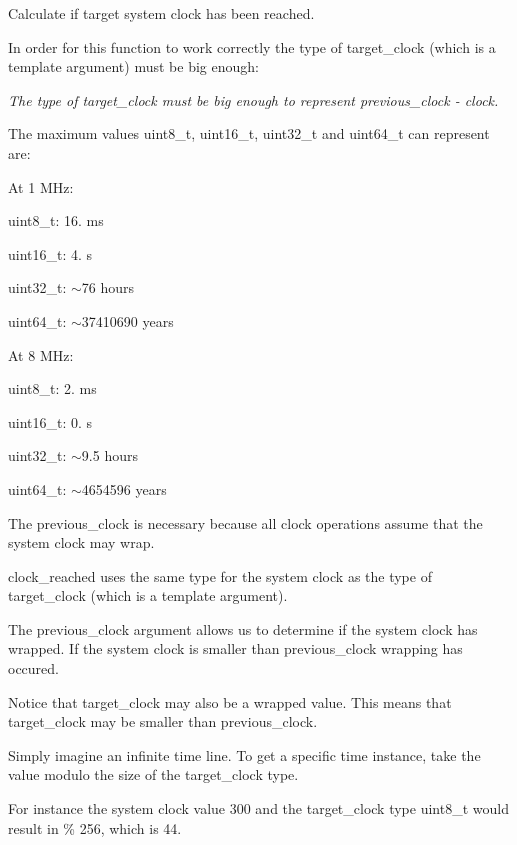 Calculate if target system clock has been reached. 

In order for this function to work correctly the type of target\+\_\+clock (which is a template argument) must be big enough\+:

{\itshape The type of target\+\_\+clock must be big enough to represent {\ttfamily previous\+\_\+clock -\/ clock}.}

The maximum values uint8\+\_\+t, uint16\+\_\+t, uint32\+\_\+t and uint64\+\_\+t can represent are\+:

At 1 M\+Hz\+:
\begin{DoxyItemize}
\item uint8\+\_\+t\+: 16. ms
\item uint16\+\_\+t\+: 4. s
\item uint32\+\_\+t\+: $\sim$76 hours
\item uint64\+\_\+t\+: $\sim$37\textquotesingle{}410\textquotesingle{}690 years
\end{DoxyItemize}

At 8 M\+Hz\+:
\begin{DoxyItemize}
\item uint8\+\_\+t\+: 2. ms
\item uint16\+\_\+t\+: 0. s
\item uint32\+\_\+t\+: $\sim$9.5 hours
\item uint64\+\_\+t\+: $\sim$4\textquotesingle{}654\textquotesingle{}596 years
\end{DoxyItemize}

The previous\+\_\+clock is necessary because all clock operations assume that the system clock may wrap.

clock\+\_\+reached uses the same type for the system clock as the type of target\+\_\+clock (which is a template argument).

The previous\+\_\+clock argument allows us to determine if the system clock has wrapped. If the system clock is smaller than previous\+\_\+clock wrapping has occured.

Notice that target\+\_\+clock may also be a wrapped value. This means that target\+\_\+clock may be smaller than previous\+\_\+clock.

Simply imagine an infinite time line. To get a specific time instance, take the value modulo the size of the target\+\_\+clock type.

For instance the system clock value 300 and the target\+\_\+clock type uint8\+\_\+t would result in { \% 256}, which is 44.

